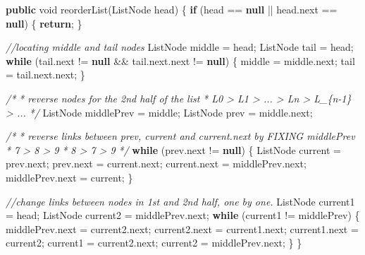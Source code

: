 \documentclass[]{book}
\newenvironment{Shaded}{\begin{snugshade}}{\end{snugshade}}
\newcommand{\CommentTok}[1]{\textcolor[rgb]{0.56,0.35,0.01}{\textit{#1}}}
\newcommand{\DataTypeTok}[1]{\textcolor[rgb]{0.13,0.29,0.53}{#1}}
\newcommand{\FunctionTok}[1]{\textcolor[rgb]{0.00,0.00,0.00}{#1}}
\newcommand{\KeywordTok}[1]{\textcolor[rgb]{0.13,0.29,0.53}{\textbf{#1}}}
\newcommand{\NormalTok}[1]{#1}
\begin{document}
\begin{Shaded}
\begin{Highlighting}[]
\KeywordTok{public} \DataTypeTok{void} \FunctionTok{reorderList}\NormalTok{(ListNode head) \{}
    \KeywordTok{if}\NormalTok{ (head == }\KeywordTok{null}\NormalTok{ || head.}\FunctionTok{next}\NormalTok{ == }\KeywordTok{null}\NormalTok{) \{}
        \KeywordTok{return}\NormalTok{;}
\NormalTok{    \}}

    \CommentTok{//locating middle and tail nodes}
\NormalTok{    ListNode middle = head;}
\NormalTok{    ListNode tail = head;}
    \KeywordTok{while}\NormalTok{ (tail.}\FunctionTok{next}\NormalTok{ != }\KeywordTok{null}\NormalTok{ && tail.}\FunctionTok{next}\NormalTok{.}\FunctionTok{next}\NormalTok{ != }\KeywordTok{null}\NormalTok{) \{}
\NormalTok{        middle = middle.}\FunctionTok{next}\NormalTok{;}
\NormalTok{        tail = tail.}\FunctionTok{next}\NormalTok{.}\FunctionTok{next}\NormalTok{;}
\NormalTok{    \}}


    \CommentTok{/*}
\CommentTok{    * reverse nodes for the 2nd half of the list}
\CommentTok{    * L0 > L1 > ... > Ln > L_\{n-1\} > ...}
\CommentTok{    */}
\NormalTok{    ListNode middlePrev = middle;}
\NormalTok{    ListNode prev = middle.}\FunctionTok{next}\NormalTok{;}

    \CommentTok{/*}
\CommentTok{    * reverse links between prev, current and current.next by FIXING middlePrev}
\CommentTok{    * 7 > 8 > 9}
\CommentTok{    * 8 > 7 > 9}
\CommentTok{    */}
    \KeywordTok{while}\NormalTok{ (prev.}\FunctionTok{next}\NormalTok{ != }\KeywordTok{null}\NormalTok{) \{}
\NormalTok{        ListNode current = prev.}\FunctionTok{next}\NormalTok{;}
\NormalTok{        prev.}\FunctionTok{next}\NormalTok{ = current.}\FunctionTok{next}\NormalTok{;}
\NormalTok{        current.}\FunctionTok{next}\NormalTok{ = middlePrev.}\FunctionTok{next}\NormalTok{;}
\NormalTok{        middlePrev.}\FunctionTok{next}\NormalTok{ = current;}
\NormalTok{    \}}

    \CommentTok{//change links between nodes in 1st and 2nd half, one by one.}
\NormalTok{    ListNode current1 = head;}
\NormalTok{    ListNode current2 = middlePrev.}\FunctionTok{next}\NormalTok{;}
    \KeywordTok{while}\NormalTok{ (current1 != middlePrev) \{}
\NormalTok{        middlePrev.}\FunctionTok{next}\NormalTok{ = current2.}\FunctionTok{next}\NormalTok{;}
\NormalTok{        current2.}\FunctionTok{next}\NormalTok{ = current1.}\FunctionTok{next}\NormalTok{;}
\NormalTok{        current1.}\FunctionTok{next}\NormalTok{ = current2;}
\NormalTok{        current1 = current2.}\FunctionTok{next}\NormalTok{;}
\NormalTok{        current2 = middlePrev.}\FunctionTok{next}\NormalTok{;}
\NormalTok{    \}}
\NormalTok{\}}
\end{Highlighting}
\end{Shaded}
\end{document}
